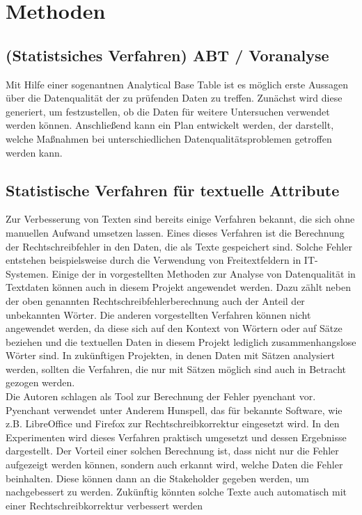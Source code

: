 \chapter{Methoden}\label{ch:method}



\section{(Statistsiches Verfahren) ABT / Voranalyse}
Mit Hilfe einer sogenantnen Analytical Base Table ist es möglich erste Aussagen über die Datenqualität der zu prüfenden Daten zu treffen.
Zunächst wird diese generiert, um festzustellen, ob die Daten für weitere Untersuchen verwendet werden können.
Anschließend kann ein Plan entwickelt werden, der darstellt, welche Maßnahmen bei unterschiedlichen Datenqualitätsproblemen getroffen werden kann.


\section{Statistische Verfahren für textuelle Attribute}
\label{sec:textVerfahren}
Zur Verbesserung von Texten sind bereits einige Verfahren bekannt, die sich ohne manuellen Aufwand umsetzen lassen.
Eines dieses Verfahren ist die Berechnung der Rechtschreibfehler in den Daten, die als Texte gespeichert sind. 
Solche Fehler entstehen beispielsweise durch die Verwendung von Freitextfeldern in IT-Systemen.  
Einige der in \cite{kiefer2019} vorgestellten Methoden zur Analyse von Datenqualität in Textdaten können auch in diesem Projekt angewendet werden. 
Dazu zählt neben der oben genannten Rechtschreibfehlerberechnung auch der Anteil der unbekannten Wörter. 
Die anderen vorgestellten Verfahren können nicht angewendet werden, da diese sich auf den Kontext von Wörtern oder auf Sätze beziehen und die textuellen Daten in diesem Projekt lediglich zusammenhangslose Wörter sind.
In zukünftigen Projekten, in denen Daten mit Sätzen analysiert werden, sollten die Verfahren, die nur mit Sätzen möglich sind auch in Betracht gezogen werden. \\

Die Autoren schlagen als Tool zur Berechnung der Fehler pyenchant vor. \cite{https://pypi.org/project/pyenchant/}
Pyenchant verwendet unter Anderem Hunspell,\cite{https://abiword.github.io/enchant/} das für bekannte Software, wie z.B. LibreOffice und Firefox zur Rechtschreibkorrektur eingesetzt wird. \cite{http://hunspell.github.io/}
In den Experimenten wird dieses Verfahren praktisch umgesetzt und dessen Ergebnisse dargestellt. 
Der Vorteil einer solchen Berechnung ist, dass nicht nur die Fehler aufgezeigt werden können, sondern auch erkannt wird, welche Daten die Fehler beinhalten. 
Diese können dann an die Stakeholder gegeben werden, um nachgebessert zu werden.
Zukünftig könnten solche Texte auch automatisch mit einer Rechtschreibkorrektur verbessert werden \cite{kiefer2019} \\

